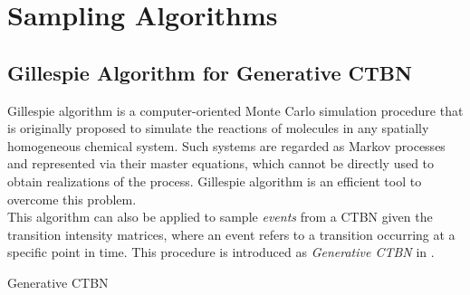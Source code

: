 
\section{Sampling Algorithms}
\label{sec:sampling_alg}
\subsection{Gillespie Algorithm for Generative CTBN}
Gillespie algorithm is a computer-oriented Monte Carlo simulation procedure that is originally proposed to simulate the reactions of molecules in any spatially homogeneous chemical system. Such systems are regarded as Markov processes and represented via their master equations, which cannot be directly used to obtain realizations of the process. Gillespie algorithm is an efficient tool to overcome this problem. \cite{Gillespie1976}\\
This algorithm can also be applied to sample \textit{events} from a CTBN given the transition intensity matrices, where an event refers to a transition occurring at a specific point in time. This procedure is introduced as \textit{Generative CTBN} in \cite{Nodelman1995}.


\begin{algorithm}[H]
	
	
	\begin{algorithmic}[1]
		\ENDWHILE
	\end{algorithmic}
	\caption{Generative CTBN}
	\label{alg:generative_ctbn}
\end{algorithm}

